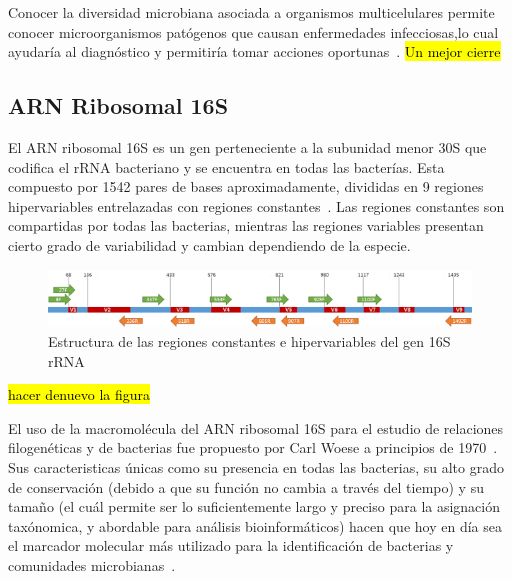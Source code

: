 Conocer la diversidad microbiana asociada a organismos multicelulares permite conocer microorganismos patógenos que causan enfermedades infecciosas,lo cual ayudaría al diagnóstico y permitiría tomar acciones oportunas~\cite{yan2018municipal,rackaityte2020human}. 
\hl{Un mejor cierre}
\subsection{ARN Ribosomal 16S}
El ARN ribosomal 16S es un gen perteneciente a la subunidad menor 30S que codifica el rRNA bacteriano y se encuentra en todas las bacterías. 
Esta compuesto por 1542 pares de bases aproximadamente, divididas en 9 regiones hipervariables entrelazadas con regiones constantes~\cite{clarridge2004impact}.
Las regiones constantes son compartidas por todas las bacterias, mientras las regiones variables presentan cierto grado de variabilidad y cambian dependiendo de la especie. 



\begin{figure}[H]
    \centering
    \includegraphics[width=1\linewidth]{images/16S.png}
    \caption{Estructura de las regiones constantes e hipervariables del gen 16S rRNA}
    \label{fig:16S_structure}
\end{figure}

\hl{hacer denuevo la figura}

El uso de la macromolécula del ARN ribosomal  16S para el estudio de relaciones filogenéticas y de bacterias fue propuesto por Carl Woese a principios de 1970~\cite{olsen1993ribosomal}.
Sus caracteristicas únicas como su presencia en todas las bacterias, su alto grado de conservación (debido a que su función no cambia a través del tiempo) y su tamaño (el cuál permite ser lo suficientemente largo y preciso para la asignación taxónomica, y abordable para análisis bioinformáticos) hacen que hoy en día sea el marcador molecular más utilizado para la identificación de bacterias y comunidades microbianas~\cite{reller2007detection,janda200716s,lopez2023determining,patel200116s}.



